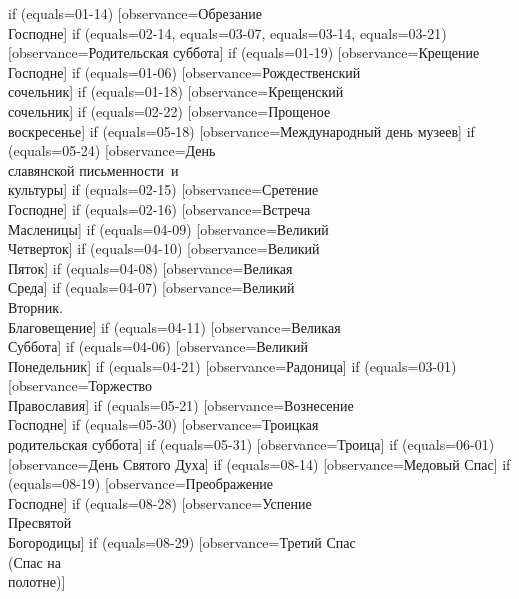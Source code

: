 {  %
  if (equals=01-14) [observance=Обрезание\\ Господне]
  if (equals=02-14,
  	equals=03-07,
	equals=03-14,
	equals=03-21) [observance=Родительская суббота]
  if (equals=01-19) [observance=Крещение\\ Господне]
  if (equals=01-06) [observance=Рождественский\\ сочельник]
  if (equals=01-18) [observance=Крещенский\\ сочельник]
  if (equals=02-22) [observance=Прощеное\\ воскресенье]
  if (equals=05-18) [observance=Международный день музеев]
  if (equals=05-24) [observance=День\\ славянской письменности~и\\культуры]
  if (equals=02-15) [observance=Сретение\\ Господне]
  if (equals=02-16) [observance=Встреча\\ Масленицы]
  if (equals=04-09) [observance=Великий\\ Четверток]
  if (equals=04-10) [observance=Великий\\ Пяток]
  if (equals=04-08) [observance=Великая\\ Среда]
  if (equals=04-07) [observance=Великий\\ Вторник.\\ Благовещение]
  if (equals=04-11) [observance=Великая\\ Суббота]
  if (equals=04-06) [observance=Великий\\ Понедельник]
  if (equals=04-21) [observance=Радоница]
  if (equals=03-01) [observance=Торжество\\ Православия]
  if (equals=05-21) [observance=Вознесение\\ Господне]
  if (equals=05-30) [observance=Троицкая\\ родительская суббота]
  if (equals=05-31) [observance=Троица]
  if (equals=06-01) [observance=День Святого Духа]
  if (equals=08-14) [observance=Медовый Спас]
  if (equals=08-19) [observance=Преображение\\ Господне]
  if (equals=08-28) [observance=Успение\\ Пресвятой\\ Богородицы]
  if (equals=08-29) [observance=Третий Спас\\ (Спас на\\ полотне)]
}
